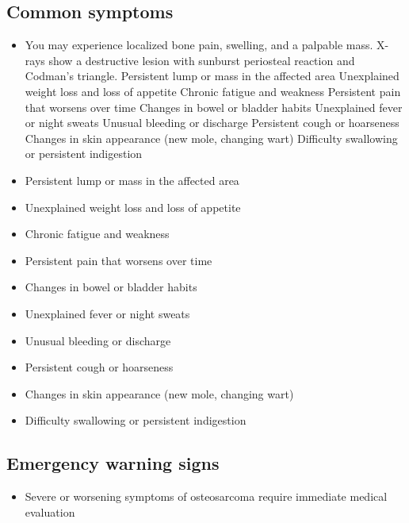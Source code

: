 \subsection{Common symptoms}
\begin{itemize}[noitemsep]
  \item You may experience localized bone pain, swelling, and a palpable mass. X-rays show a destructive lesion with sunburst periosteal reaction and Codman's triangle. Persistent lump or mass in the affected area Unexplained weight loss and loss of appetite Chronic fatigue and weakness Persistent pain that worsens over time Changes in bowel or bladder habits Unexplained fever or night sweats Unusual bleeding or discharge Persistent cough or hoarseness Changes in skin appearance (new mole, changing wart) Difficulty swallowing or persistent indigestion
  \item Persistent lump or mass in the affected area
  \item Unexplained weight loss and loss of appetite
  \item Chronic fatigue and weakness
  \item Persistent pain that worsens over time
  \item Changes in bowel or bladder habits
  \item Unexplained fever or night sweats
  \item Unusual bleeding or discharge
  \item Persistent cough or hoarseness
  \item Changes in skin appearance (new mole, changing wart)
  \item Difficulty swallowing or persistent indigestion
\end{itemize}

\subsection{Emergency warning signs}
\begin{itemize}[noitemsep]
  \item Severe or worsening symptoms of osteosarcoma require immediate medical evaluation
\end{itemize}
